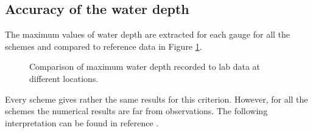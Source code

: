 \subsection{Accuracy of the water depth}

The maximum values of water depth are extracted for each gauge for all the
schemes and compared to reference data in Figure \ref{tab:malpasset:max}.

\begin{figure}[H]
\begin{minipage}[t]{0.5\textwidth}
 \centering
\end{minipage}
\begin{minipage}[t]{0.5\textwidth}
 \centering
\end{minipage}
\begin{minipage}[t]{0.5\textwidth}
 \centering
\end{minipage}
\begin{minipage}[t]{0.5\textwidth}
 \centering
\end{minipage}
\begin{minipage}[t]{0.5\textwidth}
 \centering
\end{minipage}
\begin{minipage}[t]{0.5\textwidth}
 \centering
\end{minipage}
  \caption{Comparison of maximum water depth recorded to lab data at different locations.}
  \label{tab:malpasset:max}
\end{figure}

Every scheme gives rather the same results for this criterion.
However, for all the schemes the numerical results are far from observations.
The following interpretation can be found in reference \cite{Hervouet2007}.\\

